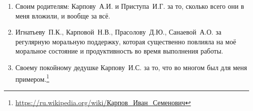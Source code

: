 \begin{enumerate}
\item Своим родителям: Карпову~А.\:И. и Приступа~И.\:Г. за то, сколько всего они в меня вложили, и вообще за всё.
\item Игнатьеву~П.\:К., Карповой~Н.\:В., Прасолову~Д.\:Ю., Санаевой~А.\:О. за регулярную моральную поддержку, которая существенно повлияла на моё моральное состояние и продуктивность во время выполнения работы. 
\item Своему покойному дедушке Карпову~И.\:С. за то, что во многом был для меня примером.\footnote{\url{https://ru.wikipedia.org/wiki/Карпов\_Иван\_Семенович}}
\end{enumerate}


